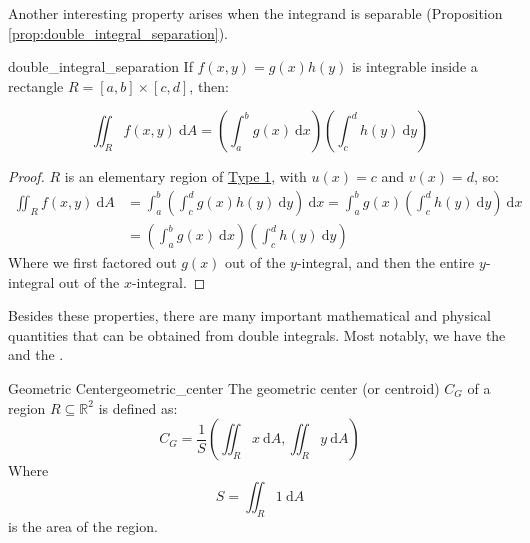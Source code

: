 Another interesting property arises when the integrand is separable (Proposition \ref{prop:double_integral_separation}).

\begin{aproposition}{}{double_integral_separation}
    If $f(x,y) = g(x) h(y)$ is integrable inside a rectangle $R= [a,b] \times [c,d] $, then:

    \begin{equation*}
        \iint_R f(x,y) \ \mathrm{d} A = \left(\int_{a}^{b}  g(x) \ \mathrm{d} x\right) \left(\int_{c}^{d}  h(y) \ \mathrm{d} y\right)
    \end{equation*}
    
\end{aproposition}

\begin{proof}
    $R$ is an elementary region of \hyperref[eq:elregtype1]{Type 1}, with $u(x)=c$ and $v(x)=d$, so:
    \begin{equation*}
        \begin{aligned}
            \iint_R f(x,y) \ \mathrm{d} A &= \int_{a}^{b} \left( \int_{c}^{d} g(x) h(y) \ \mathrm{d} y\right) \ \mathrm{d} x = \int_{a}^{b} g(x) \left( \int_{c}^{d}  h(y) \ \mathrm{d} y\right) \ \mathrm{d} x\\ &= \left(\int_{a}^{b}  g(x) \ \mathrm{d} x\right) \left(\int_{c}^{d}  h(y) \ \mathrm{d} y\right)
        \end{aligned}
    \end{equation*}
    Where we first factored out $g(x)$ out of the $y$-integral, and then the entire $y$-integral out of the $x$-integral.
\end{proof}

Besides these properties, there are many important mathematical and physical quantities that can be obtained from double integrals. Most notably, we have the  and the .

\begin{adefinition}{Geometric Center}{geometric_center}
    The geometric center (or centroid) $C_G$ of a region $R \subseteq \mathbb{R}^2$ is defined as:
    \begin{equation*}
        C_G = \frac{1}{S}\left(\iint_R x \ \mathrm{d} A, \iint_R y \ \mathrm{d} A \right)
    \end{equation*}
    Where
    \begin{equation*}
        S = \iint_R 1 \ \mathrm{d} A
    \end{equation*}
    is the area of the region.
\end{adefinition}


